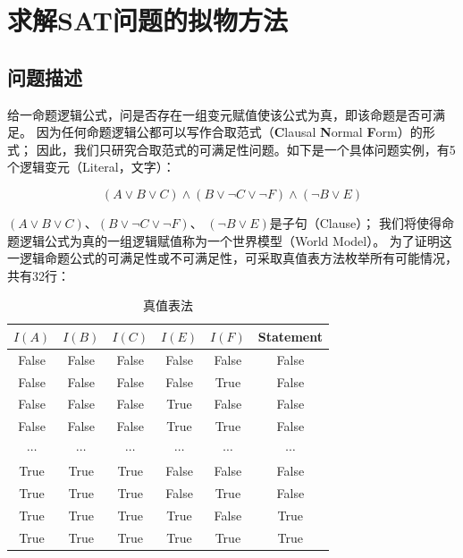 \documentclass[12pt]{ctexart}
\begin{document}
\section{求解SAT问题的拟物方法}

\subsection{问题描述}

给一命题逻辑公式，问是否存在一组变元赋值使该公式为真，即该命题是否可满足。
因为任何命题逻辑公都可以写作合取范式（\textbf{C}lausal \textbf{N}ormal \textbf{F}orm）的形式；
因此，我们只研究合取范式的可满足性问题。如下是一个具体问题实例，有5个逻辑变元（Literal，文字）：

$$(A \vee B \vee C) \wedge (B \vee \neg C \vee \neg F) \wedge (\neg B \vee E)$$

$(A \vee B \vee C)$、$(B \vee \neg C \vee \neg F)$、 $(\neg B \vee E)$是子句（Clause）；
我们将使得命题逻辑公式为真的一组逻辑赋值称为一个世界模型（World Model）。
为了证明这一逻辑命题公式的可满足性或不可满足性，可采取真值表方法枚举所有可能情况，共有32行：

\begin{table}[htbp]
    \caption[1]{真值表法}
    \centering

    \begin{threeparttable}
        \begin{tabular}{cccccc}
            \toprule
            $I(A)$   & $I(B)$   & $I(C)$   & $I(E)$   & $I(F)$   & Statement \\
            \midrule
            False    & False    & False    & False    & False    & False     \\
            False    & False    & False    & False    & True     & False     \\
            False    & False    & False    & True     & False    & False     \\
            False    & False    & False    & True     & True     & False     \\
            $\cdots$ & $\cdots$ & $\cdots$ & $\cdots$ & $\cdots$ & $\cdots$  \\
            True     & True     & True     & False    & False    & False     \\
            True     & True     & True     & False    & True     & False     \\
            True     & True     & True     & True     & False    & True      \\
            True     & True     & True     & True     & True     & True      \\
            \bottomrule
        \end{tabular}
    \end{threeparttable}
    \qquad
\end{table}
\end{document}
